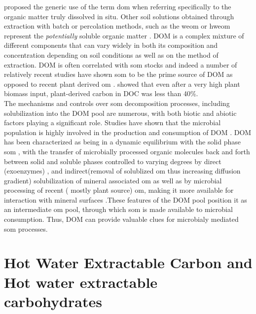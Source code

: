 \documentclass[12pt]{report}
\begin{document}
		\citet{zsolnay2003} proposed the generic use of the term \gls{dom} when referring specifically to the organic matter truly dissolved in situ. Other soil solutions obtained through extraction with batch or percolation methods, such as the \gls{weom} or \gls{hweom} represent the \textit{potentially} soluble organic matter \citep{marschner2003}. DOM is a complex mixture of different components that can vary widely in both its composition and concentration depending on soil conditions  as well as on the method of extraction\citep{bolan2011}. DOM is often  correlated with \gls{som} stocks and indeed a number of relatively recent studies have shown \gls{som} to be the prime source of DOM as opposed to  recent plant derived \gls{om} \citep{malik2013, kaiser2012}. \citet{malik2013}showed that  even after a very high plant biomass input, plant-derived carbon in DOC was less than 40\%.\\
		The mechanisms and controls over \gls{som} decomposition processes, including solubilization  into the DOM pool are numerous, with both biotic and abiotic factors playing a significant role\citep{kalbitz2000, bolan2011}. Studies have shown that the microbial population is highly involved in the production and consumption of DOM \citep{marschnerp2002, malik2013, guggenberger1998}.  DOM has been characterized as being in a dynamic equilibrium with the solid phase \gls{som} \citep{roth2019, kaiser2012},  with the transfer of microbially processed organic molecules back and forth between solid and soluble phases controlled to varying degrees by  direct (exoenzymes) \citep{guggenberger1998},  and indirect(removal of solublized \gls{om} thus increasing diffusion gradient) solubilization of mineral associated \gls{om} as well as by microbial processing of recent ( mostly plant source) \gls{om}, making it more available for interaction with mineral surfaces \citep{kalbitz2003, kalbitz2008}.These features of the DOM pool position it as an intermediate \gls{om} pool, through which \gls{som} is made available to microbial consumption. Thus, DOM can provide valuable clues for microbialy mediated \gls{som} processes. \\
		
		\section{Hot Water Extractable Carbon and Hot water extractable carbohydrates}
		
\end{document}
